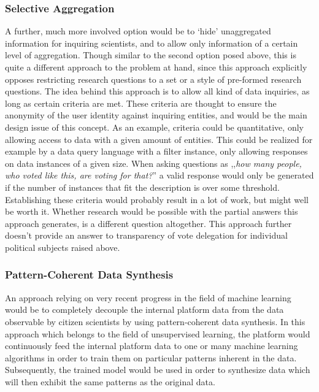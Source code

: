 \subsubsection{Selective Aggregation}

A further, much more involved option would be to ‘hide' unaggregated information for inquiring scientists, and to allow only information of a certain level of aggregation. Though similar to the second option posed above, this is quite a different approach to the problem at hand, since this approach explicitly opposes restricting research questions to a set or a style of pre-formed research questions. The idea behind this approach is to allow all kind of data inquiries, as long as certain criteria are met. These criteria are thought to ensure the anonymity of the user identity against inquiring entities, and would be the main design issue of this concept. As an example, criteria could be quantitative, only allowing access to data with a given amount of entities. This could be realized for example by a data query language with a filter instance, only allowing responses on data instances of a given size. When asking questions as ,,\textit{how many people, who voted like this, are voting for that?}'' a valid response would only be generated if the number of instances that fit the description is over some threshold. Establishing these criteria would probably result in a lot of work, but might well be worth it. Whether research would be possible with the partial answers this approach generates, is a different question altogether. 
This approach further doesn't provide an answer to transparency of vote delegation for individual political subjects raised above.


\subsubsection{Pattern-Coherent Data Synthesis}

An approach relying on very recent progress in the field of machine learning would be to completely decouple the internal platform data from the data observable by citizen scientists by using pattern-coherent data synthesis. In this approach which belongs to the field of unsupervised learning, the platform would continuously feed the internal platform data to one or many machine learning algorithms in order to train them on particular patterns inherent in the data. Subsequently, the trained model would be used in order to synthesize data which will then exhibit the same patterns as the original data. 

